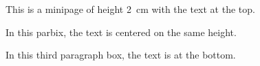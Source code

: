 \documentclass[12pt,twoside,a4paper]{article}   %
\begin{document}
	\begin{minipage}[t][2cm][t]{3cm}
		This is a minipage of height 2~cm with the text at the top.
	\end{minipage}\hrulefill
	\parbox[t][2cm][c]{3cm}{In this parbix, the text is centered on the same height.}\hrulefill
	\begin{minipage}[t][2cm][b]{3cm}
		In this third paragraph box, the text is at the bottom.
	\end{minipage}
\end{document}
